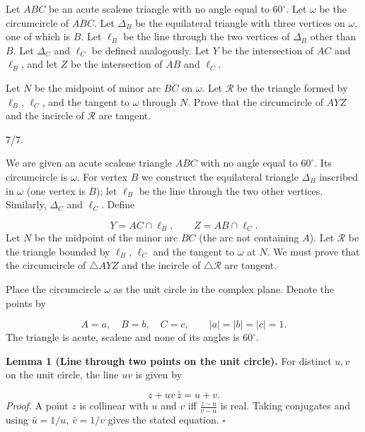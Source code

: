 \begin{mdframed}[style=mdpurplebox,frametitle={USAMO 2026 Problem 3}]
Let $ABC$ be an acute scalene triangle with no angle equal to $60^\circ$. Let $\omega$ be the circumcircle of $ABC$. Let $\Delta_B$ be the equilateral triangle with three vertices on $\omega$, one of which is $B$. Let $\ell_B$ be the line through the two vertices of $\Delta_B$ other than $B$. Let $\Delta_C$ and $\ell_C$ be defined analogously. Let $Y$ be the intersection of $AC$ and $\ell_B$, and let $Z$ be the intersection of $AB$ and $\ell_C$.

Let $N$ be the midpoint of minor arc $BC$ on $\omega$. Let $\mathcal{R}$ be the triangle formed by $\ell_B$, $\ell_C$, and the tangent to $\omega$ through $N$. Prove that the circumcircle of $AYZ$ and the incircle of $\mathcal{R}$ are tangent.
\end{mdframed}
\begin{remark*}
  7/7.
\end{remark*}
We are given an acute scalene triangle \(ABC\) with no angle equal to \(60^\circ\). Its circumcircle is \(\omega\). For vertex \(B\) we construct the equilateral triangle \(\Delta_B\) inscribed in \(\omega\) (one vertex is \(B\)); let \(\ell_B\) be the line through the two other vertices. Similarly, \(\Delta_C\) and \(\ell_C\). Define\par
\[
Y = AC \cap \ell_B,\qquad Z = AB \cap \ell_C.
\]
Let \(N\) be the midpoint of the minor arc \(BC\) (the arc not containing \(A\)). Let \(\mathcal{R}\) be the triangle bounded by \(\ell_B\), \(\ell_C\) and the tangent to \(\omega\) at \(N\). We must prove that the circumcircle of \(\triangle AYZ\) and the incircle of \(\triangle\mathcal{R}\) are tangent.\par
\smallskip
{}
Place the circumcircle \(\omega\) as the unit circle in the complex plane. Denote the points by\par
\[
A = a,\quad B = b,\quad C = c,\qquad |a|=|b|=|c|=1.
\]
The triangle is acute, scalene and none of its angles is \(60^\circ\).\par
\textbf{Lemma 1 (Line through two points on the unit circle).} For distinct \(u,v\) on the unit circle, the line \(uv\) is given by\par
\[
z + uv\,\bar{z} = u+v.
\]
\emph{Proof.} A point \(z\) is collinear with \(u\) and \(v\) iff \(\frac{z-u}{v-u}\) is real. Taking conjugates and using \(\bar u = 1/u\), \(\bar v = 1/v\) gives the stated equation. \(\square\)\par
